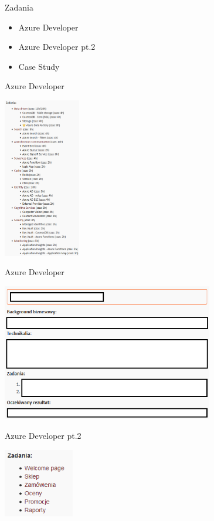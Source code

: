 \documentclass{beamer}
\begin{document}
\begin{frame}{Zadania}
	\begin{huge}
		\begin{itemize}
			\item Azure Developer
			\item Azure Developer pt.2
			\item Case Study
		\end{itemize}
	\end{huge}
\end{frame}

\begin{frame}{Azure Developer}
	\begin{center}
		\includegraphics[height=7cm]{azure_developer2.png}
	\end{center}
\end{frame}

\begin{frame}{Azure Developer}
	\begin{center}
		\includegraphics[height=6cm]{ad_zadanie.PNG}
	\end{center}
\end{frame}

\begin{frame}{Azure Developer pt.2}
	\begin{center}
		\includegraphics[height=3cm]{azure_developer_pt2.png}
	\end{center}
\end{frame}
\end{document}
